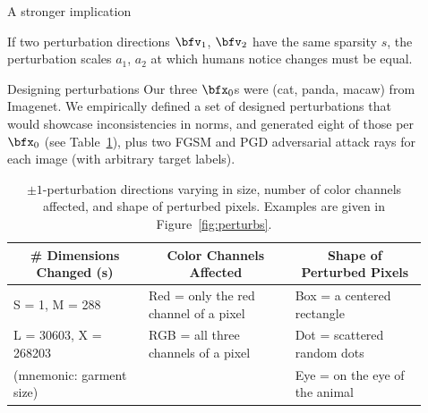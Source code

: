 \documentclass[final,notheorems]{beamer}
\newlength{\sepwidth}
\newlength{\colwidth}
\newcommand{\separatorcolumn}{\begin{column}{\sepwidth}\end{column}}
\begin{document}
\begin{frame}[t]
\begin{columns}[t]
\begin{column}{\colwidth}
\begin{block}{A stronger implication}
    \hspace*{.1\linewidth}\colorbox{highlightbg}{\begin{minipage}{.8\linewidth}
      If two perturbation directions $\bfv_1$, $\bfv_2$ have the same sparsity $s$, the perturbation scales $a_1$, $a_2$ at which humans notice changes must be equal.
    \end{minipage}}
  \end{block}

    \begin{block}{Designing perturbations}
    Our three $\bfx_0$s were (cat, panda, macaw) from Imagenet. We empirically defined a set of designed perturbations that would showcase inconsistencies in norms, and generated eight of those per $\bfx_0$ (see Table~\ref{tab:rays}), plus two FGSM and PGD adversarial attack rays for each image (with arbitrary target labels).
    \begin{table}
        \centering
          \begin{small}
            \begin{tabular}{l|l|l}
              \multicolumn{1}{c|}{\textbf{\# Dimensions Changed (s)}} & \multicolumn{1}{c|}{\textbf{Color Channels Affected}} & \multicolumn{1}{c}{\textbf{Shape of Perturbed Pixels}} \\\hline
              S = 1, M = 288 & Red = only the red channel of a pixel & Box = a centered rectangle \\
              L = 30603, X = 268203 & RGB = all three channels of a pixel & Dot = scattered random dots \\
              (mnemonic: garment size) & & Eye = on the eye of the animal \\
            \end{tabular}
          \end{small}
        \caption{$\pm1$-perturbation directions varying in size, number of color channels affected, and shape of perturbed pixels. Examples are given in Figure~\ref{fig:perturbs}.}
        \label{tab:rays}
    \end{table}

  \end{block}
\end{column}

\separatorcolumn

\begin{column}{\colwidth}


\end{column}
\end{columns}
\end{frame}
\end{document}
